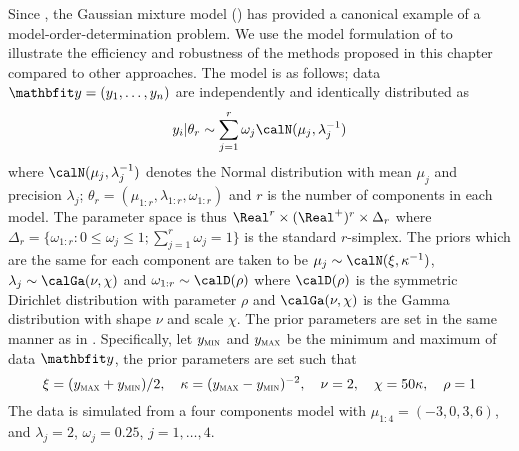 Since \cite{Richardson:1997ea}, the Gaussian mixture model (\gmm) has provided a canonical example of a model-order-determination problem. We use the model formulation of \cite{DelMoral:2006hc} to illustrate the efficiency and robustness of the methods proposed in this chapter compared to other approaches. The model is as follows; data $\data = (y_1,\dots,y_n)$ are independently and identically distributed as
\begin{equation*}
  y_i|\theta_r \sim \sum_{j=1}^r \omega_j\calN(\mu_j,\lambda_j^{-1})
\end{equation*}
where $\calN(\mu_j,\lambda_j^{-1})$ denotes the Normal distribution with mean $\mu_j$ and precision $\lambda_j$; $\theta_r = (\mu_{1:r},\lambda_{1:r},\omega_{1:r})$ and $r$ is the number of components in each model. The parameter space is thus $\Real^r \times (\Real^{+})^r\times \Delta_r$ where $\Delta_r = \{\omega_{1:r}:0\le\omega_j\le1; \sum_{j=1}^r\omega_j=1\}$ is the standard $r$-simplex. The priors which are the same for each component are taken to be $\mu_j\sim\calN(\xi,\kappa^{-1})$, $\lambda_j\sim\calGa(\nu,\chi)$ and $\omega_{1:r}\sim\calD(\rho)$ where $\calD(\rho)$ is the symmetric Dirichlet distribution with parameter $\rho$ and $\calGa(\nu,\chi)$ is the Gamma distribution with shape $\nu$ and scale $\chi$. The prior parameters are set in the same manner as in \cite{Richardson:1997ea}. Specifically, let $y_{\text{\textsc{min}}}$ and $y_{\text{\textsc{max}}}$ be the minimum and maximum of data $\data$, the prior parameters are set such that
\begin{equation*}
  \xi = (y_{\text{\textsc{max}}} + y_{\text{\textsc{min}}}) / 2, \quad
  \kappa = (y_{\text{\textsc{max}}} - y_{\text{\textsc{min}}})^{-2}, \quad
  \nu = 2, \quad \chi = 50\kappa, \quad \rho = 1
\end{equation*}
The data is simulated from a four components model with $\mu_{1:4} = (-3, 0,3, 6)$, and $\lambda_j =2$, $\omega_j = 0.25$, $j = 1,\dots,4$.

